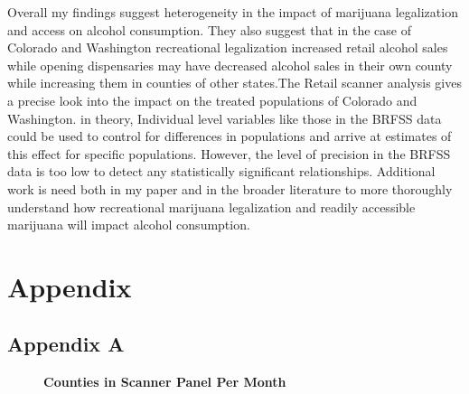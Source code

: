 \documentclass[11pt]{article}
\begin{document}
Overall my findings suggest heterogeneity in the impact of marijuana legalization and access on alcohol consumption. They also suggest that in the case of Colorado and Washington recreational legalization increased retail alcohol sales while opening dispensaries may have decreased alcohol sales in their own county while increasing them in counties of other states.The Retail scanner analysis gives a precise look into the impact on the treated populations of Colorado and Washington. in theory, Individual level variables like those in the BRFSS data could be used to control for differences in populations and arrive at estimates of this effect for specific populations. However, the level of precision in the BRFSS data is too low to detect any statistically significant relationships. Additional work is need both in my paper and in the broader literature to more thoroughly understand how recreational marijuana legalization and readily accessible marijuana will impact alcohol consumption. 
 





\section{Appendix}

\subsection{Appendix A}

\begin{figure}[H]
	\centering
	\LARGE{\textbf{Counties in Scanner Panel Per Month}}\par\medskip
	\scalebox{.6}{
	
}
	\scalebox{.6}{
	
}
\end{figure}


\end{document}
